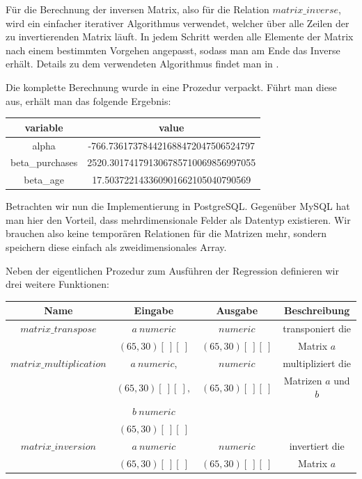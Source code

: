 Für die Berechnung der inversen Matrix, also für die Relation $matrix\_inverse$, wird ein einfacher iterativer Algorithmus verwendet, welcher über alle Zeilen der zu invertierenden Matrix läuft. In jedem Schritt werden alle Elemente der Matrix nach einem bestimmten Vorgehen angepasst, sodass man am Ende das Inverse erhält. Details zu dem verwendeten Algorithmus findet man in \cite{matrix}.

Die komplette Berechnung wurde in eine Prozedur verpackt. Führt man diese aus, erhält man das folgende Ergebnis:

\begin{center}
  \begin{tabular}{|c|c|}\hline
    \textbf{variable} & \textbf{value} \\ \hline
    alpha & -766.736173784421688472047506524797 \\ \hline
    beta\_purchases & 2520.301741791306785710069856997055 \\ \hline
    beta\_age & 17.503722143360901662105040790569 \\ \hline
  \end{tabular}
\end{center}

Betrachten wir nun die Implementierung in PostgreSQL. Gegenüber MySQL hat man hier den Vorteil, dass mehrdimensionale Felder als Datentyp existieren. Wir brauchen also keine temporären Relationen für die Matrizen mehr, sondern speichern diese einfach als zweidimensionales Array.

Neben der eigentlichen Prozedur zum Ausführen der Regression definieren wir drei weitere Funktionen:
\begin{center}
  \begin{tabular}{|c|c|c|c|}\hline
    \textbf{Name} & \textbf{Eingabe} & \textbf{Ausgabe} & \textbf{Beschreibung} \\ \hline
    $matrix\_transpose$ & $a ~ numeric$ & $numeric$ & transponiert die \\
     & $(65, 30)[~][~]$ & $(65, 30)[~][~]$ & Matrix $a$ \\ \hline
    $matrix\_multiplication$ & $a ~ numeric$, & $numeric$ & multipliziert die \\
     & $(65, 30)[~][~],$ & $(65, 30)[~][~]$ & Matrizen $a$ und $b$ \\
     & $b ~ numeric$ & & \\
     & $(65, 30)[~][~]$ & & \\ \hline
    $matrix\_inversion$ & $a ~ numeric$ & $numeric$ & invertiert die \\
     & $(65, 30)[~][~]$ & $(65, 30)[~][~]$ & Matrix $a$ \\ \hline
  \end{tabular}
\end{center}


